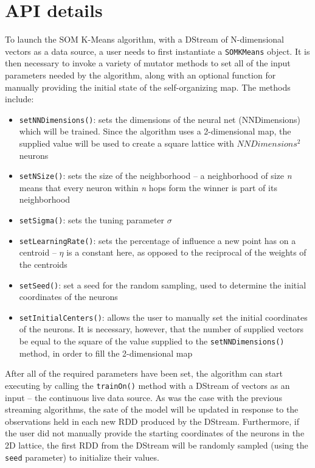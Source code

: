 \documentclass{l4proj}
\begin{document}
\section{API details}

To launch the SOM K-Means algorithm, with a DStream of N-dimensional vectors as a data source, a user needs to first instantiate a \texttt{SOMKMeans} object. It is then necessary to invoke a variety of mutator methods to set all of the input parameters needed by the algorithm, along with an optional function for manually providing the initial state of the self-organizing map. The methods include:

\begin{itemize}
\item \texttt{setNNDimensions()}: sets the dimensions of the neural net (NNDimensions) which will be trained. Since the algorithm uses a 2-dimensional map, the supplied value will be used to create a square lattice with $NNDimensions^2$ neurons
\item \texttt{setNSize()}: sets the size of the neighborhood -- a neighborhood of size \textit{n} means that every neuron within \textit{n} hops form the winner is part of its neighborhood
\item \texttt{setSigma()}: sets the tuning parameter $\sigma$
\item \texttt{setLearningRate()}: sets the percentage of influence a new point has on a centroid -- $\eta$ is a constant here, as opposed to the reciprocal of the weights of the centroids
\item \texttt{setSeed()}: set a seed for the random sampling, used to determine the initial coordinates of the neurons
\item \texttt{setInitialCenters()}: allows the user to manually set the initial coordinates of the neurons. It is necessary, however, that the number of supplied vectors be equal to the square of the value supplied to the \texttt{setNNDimensions()} method, in order to fill the 2-dimensional map
\end{itemize}

After all of the required parameters have been set, the algorithm can start executing by calling the \texttt{trainOn()} method with a DStream of vectors as an input -- the continuous live data source. As was the case with the previous streaming algorithms, the sate of the model will be updated in response to the observations held in each new RDD produced by the DStream. Furthermore, if the user did not manually provide the starting coordinates of the neurons in the 2D lattice, the first RDD from the DStream will be randomly sampled (using the \texttt{seed} parameter) to initialize their values.
\end{document}
